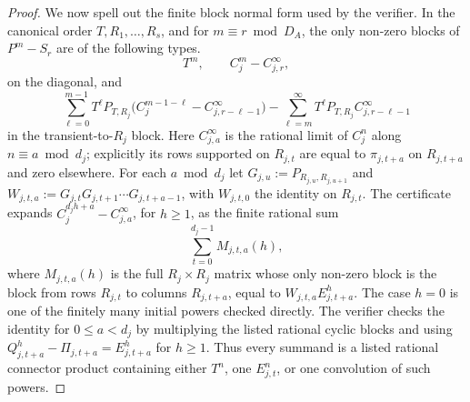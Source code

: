 \begin{proof}
  We now spell out the finite block normal form used by the verifier.
  In the canonical order \(T,R_1,\ldots,R_s\), and for
  \(m\equiv r\bmod D_A\), the only non-zero blocks of \(P^m-S_r\) are
  of the following types.
  \[
    T^m,\qquad C_j^m-C_{j,r}^{\infty},
  \]
  on the diagonal, and
  \[
    \sum_{\ell=0}^{m-1}
      T^\ell P_{T,R_j}\bigl(C_j^{m-1-\ell}-C_{j,r-\ell-1}^{\infty}\bigr)
      -
    \sum_{\ell=m}^{\infty}
      T^\ell P_{T,R_j}C_{j,r-\ell-1}^{\infty}
  \]
  in the transient-to-\(R_j\) block. Here \(C_{j,a}^{\infty}\) is the
  rational limit of \(C_j^n\) along \(n\equiv a\bmod d_j\); explicitly
  its rows supported on \(R_{j,t}\) are equal to
  \(\pi_{j,t+a}\) on \(R_{j,t+a}\) and zero elsewhere. For each
  \(a\bmod d_j\) let
  \(G_{j,u}:=P_{R_{j,u},R_{j,u+1}}\) and
  \(W_{j,t,a}:=G_{j,t}G_{j,t+1}\cdots G_{j,t+a-1}\), with
  \(W_{j,t,0}\) the identity on \(R_{j,t}\). The certificate expands
  \(C_j^{d_jh+a}-C_{j,a}^{\infty}\), for \(h\ge1\), as the finite
  rational sum
  \[
    \sum_{t=0}^{d_j-1}
      M_{j,t,a}(h),
  \]
  where \(M_{j,t,a}(h)\) is the full \(R_j\times R_j\) matrix whose only
  non-zero block is the block from rows \(R_{j,t}\) to columns
  \(R_{j,t+a}\), equal to \(W_{j,t,a}E_{j,t+a}^{h}\). The case \(h=0\)
  is one of the finitely many initial powers checked directly. The
  verifier checks the identity for \(0\le a<d_j\) by multiplying the
  listed rational cyclic blocks and using
  \(Q_{j,t+a}^{h}-\Pi_{j,t+a}=E_{j,t+a}^{h}\) for \(h\ge1\). Thus every
  summand is a listed rational connector product containing either
  \(T^n\), one \(E_{j,t}^n\), or one convolution of such powers.


\end{proof}
